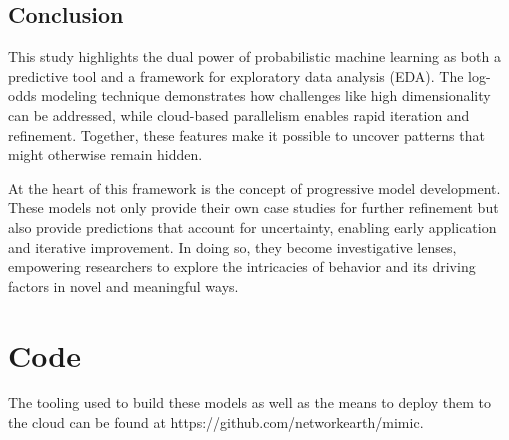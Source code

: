 \documentclass[11pt]{article}
\begin{document}
\subsection*{Conclusion}

This study highlights the dual power of probabilistic machine learning as both a predictive tool and a framework for exploratory data analysis (EDA). The log-odds modeling technique demonstrates how challenges like high dimensionality can be addressed, while cloud-based parallelism enables rapid iteration and refinement. Together, these features make it possible to uncover patterns that might otherwise remain hidden.

At the heart of this framework is the concept of progressive model development. These models not only provide their own case studies for further refinement but also provide predictions that account for uncertainty, enabling early application and iterative improvement. In doing so, they become investigative lenses, empowering researchers to explore the intricacies of behavior and its driving factors in novel and meaningful ways.


\section*{Code}

The tooling used to build these models as well as the means to deploy them to the cloud can be found at  https://github.com/networkearth/mimic.



\end{document}
